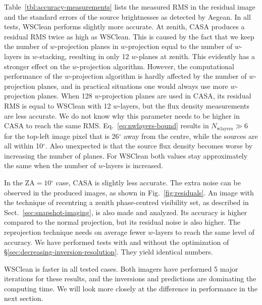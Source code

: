 \documentclass[useAMS,usenatbib]{mn2e}
\newcommand{\degree}{\ensuremath{^{\circ}}\xspace}
\begin{document}
Table~\ref{tbl:accuracy-measurements} lists the measured RMS in the residual image and the standard errors of the source brightnesses as detected by Aegean. In all tests, WSClean performs slightly more accurate. At zenith, CASA produces a residual RMS twice as high as WSClean. This is caused by the fact that we keep the number of $w$-projection planes in $w$-projection equal to the number of $w$-layers in $w$-stacking, resulting in only 12 $w$-planes at zenith. This evidently has a stronger effect on the $w$-projection algorithm. However, the computational performance of the $w$-projection algorithm is hardly affected by the number of $w$-projection planes, and in practical situations one would always use more $w$-projection planes. When 128 $w$-projection planes are used in CASA, its residual RMS is equal to WSClean with 12 $w$-layers, but the flux density measurements are less accurate. We do not know why this parameter needs to be higher in CASA to reach the same RMS.  Eq.~\eqref{eq:nwlayers-bound} results in $N_\textrm{wlayers}\gg 6$ for the top-left image pixel that is 26\degree away from the centre, while the sources are all within 10\degree. Also unexpected is that the source flux density becomes worse by increasing the number of planes. For WSClean both values stay approximately the same when the number of $w$-layers is increased.

In the $\textrm{ZA}=10\degree$ case, CASA is slightly less accurate. The extra noise can be observed in the produced images, as shown in Fig.~\ref{fig:residuals}. An image with the technique of recentring a zenith phase-centred visibility set, as described in Sect.~\ref{sec:snapshot-imaging}, is also made and analyzed. Its accuracy is higher compared to the normal projection, but its residual noise is also higher. The reprojection technique needs on average fewer $w$-layers to reach the same level of accuracy. We have performed tests with and without the optimization of \S\ref{sec:decreasing-inversion-resolution}. They yield identical numbers.

WSClean is faster in all tested cases. Both imagers have performed 5 major iterations for these results, and the inversions and predictions are dominating the computing time. We will look more closely at the difference in performance in the next section.
\end{document}
